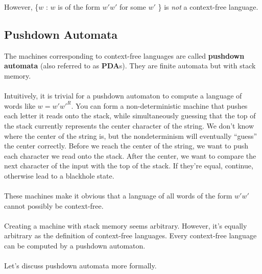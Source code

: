 \documentclass[]{article}
\theoremstyle{definition}
\begin{document}
      However, \{$w$ : $w$ is of the form $w' w'$ for some $w'$ \} is \emph{not} a context-free language.

    \subsection{Pushdown Automata}
      The machines corresponding to context-free languages are called \textbf{pushdown automata} (also referred to as \textbf{PDA}s). They are finite automata but with stack memory.
      \\ \\
      Intuitively, it is trivial for a pushdown automaton to compute a language of words like $w = w' w'^R$. You can form a non-deterministic machine that pushes each letter it reads onto the stack, while simultaneously guessing that the top of the stack currently represents the center character of the string. We don't know where the center of the string is, but the nondeterminism will eventually ``guess'' the center correctly. Before we reach the center of the string, we want to push each character we read onto the stack. After the center, we want to compare the next character of the input with the top of the stack. If they're equal, continue, otherwise lead to a blackhole state.
      \\ \\
      These machines make it obvious that a language of all words of the form $w'w'$ cannot possibly be context-free.
      \\ \\
      Creating a machine with stack memory seems arbitrary. However, it's equally arbitrary as the definition of context-free languages. Every context-free language can be computed by a pushdown automaton.
      \\ \\
      Let's discuss pushdown automata more formally.
\end{document}
